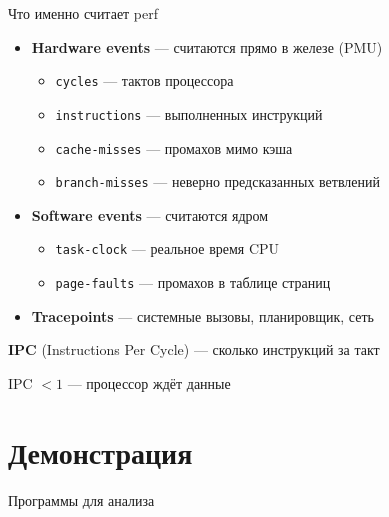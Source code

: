 \documentclass{../../slides-style}
\begin{document}
\begin{frame}{Что именно считает perf}
    \begin{itemize}
        \item \textbf{Hardware events} --- считаются прямо в железе (PMU)
              \begin{itemize}
                  \item \texttt{cycles} --- тактов процессора
                  \item \texttt{instructions} --- выполненных инструкций
                  \item \texttt{cache-misses} --- промахов мимо кэша
                  \item \texttt{branch-misses} --- неверно предсказанных ветвлений
              \end{itemize}

              \bigskip
        \item \textbf{Software events} --- считаются ядром
              \begin{itemize}
                  \item \texttt{task-clock} --- реальное время CPU
                  \item \texttt{page-faults} --- промахов в таблице страниц
              \end{itemize}

              \bigskip
        \item \textbf{Tracepoints} --- системные вызовы, планировщик, сеть
    \end{itemize}

    \bigskip

    \textbf{IPC} (Instructions Per Cycle) --- сколько инструкций за такт

    IPC $< 1$ --- процессор ждёт данные
\end{frame}

\section{Демонстрация}

\begin{frame}[fragile]{Программы для анализа}
    \begin{columns}[T]
        \inputminted[]{c}{row.c}
        \inputminted[]{c}{col.c}
    \end{columns}
\end{frame}
\end{document}
